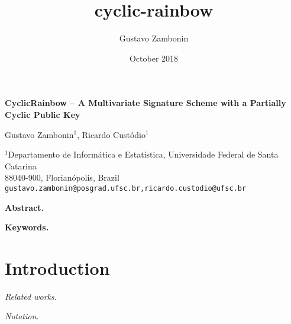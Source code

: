 \documentclass[a4paper,14pt]{extarticle}
\title{cyclic-rainbow}
\author{Gustavo Zambonin}
\date{October 2018}
\begin{document}
\begin{center}
    {\Large\bf CyclicRainbow -- A Multivariate Signature 
    Scheme with a Partially Cyclic Public Key} \vspace{.75cm}
    
    Gustavo Zambonin$^{1}$, Ricardo Custódio$^{1}$ \vspace{.5cm}
    
    $^{1}$Departamento de Informática e Estatística, Universidade Federal de Santa Catarina \\
    88040-900, Florianópolis, Brazil \\
    \texttt{gustavo.zambonin@posgrad.ufsc.br,ricardo.custodio@ufsc.br} \vspace{1cm}
    
    \textbf{Abstract.}
    
    \textbf{Keywords.}
\end{center}

\section{Introduction}

\emph{Related works.}

\emph{Notation.}
\end{document}
